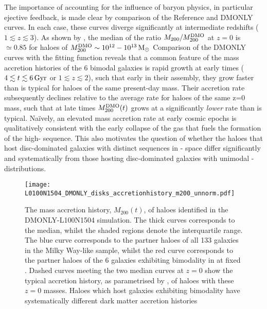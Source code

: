 The importance of accounting for the influence of baryon physics, in particular ejective feedback, is made clear by comparison of the Reference and DMONLY curves. In each case, these curves diverge significantly at intermediate redshifts ($1 \lesssim z \lesssim 3$). As shown by \citet[][their Fig. 1]{2015MNRAS.453L..58S}, the median of the ratio $M_{200}/M_{200}^{\rm DMO}$ at $z=0$ is $\simeq 0.85$ for haloes of $M_{200}^{\rm DMO} \sim 10^{12}-10^{13}\,{\rm M}_\odot$  Comparison of the DMONLY curves with the \citet{2015MNRAS.450.1514C} fitting function reveals that a common feature of the mass accretion histories of the 6 bimodal galaxies is rapid growth at early times ($4 \lesssim t \lesssim 6\,{\rm Gyr}$ or $1 \lesssim z \lesssim 2$), such that early in their assembly, they grow faster than is typical for haloes of the same present-day mass. Their accretion rate subsequently declines relative to the average rate for haloes of the same z=0 mass, such that at late times $M_{200}^{\rm DMO}(t)$ grows at a significantly \textit{lower} rate than is typical. Na\"ively, an elevated mass accretion rate at early cosmic epochs is qualitatively consistent with the early collapse of the gas that fuels the formation of the high-\afe{} sequence. This also motivates the question of whether the haloes that host disc-dominated galaxies with distinct sequences in \afe{}-\feh{} space differ significantly and systematically from those hosting disc-dominated galaxies with unimodal \afe{}-\feh{} distributions. 

\begin{figure}
\texttt{[image: L0100N1504\_DMONLY\_disks\_accretionhistory\_m200\_unnorm.pdf]}
\caption[Mass accretion history of \afe{}-bimodal haloes in the DMONLY-L100N1504 simulation, compared to the accretion history of haloes hosting galaxies at the same stellar mass which do not show the same bimodality]{\label{fig:comp_uni_bi_acc_hist} The mass accretion history, $M_{200}(t)$, of haloes identified in the DMONLY-L100N1504 simulation. The thick curves corresponds to the median, whilst the shaded regions denote the interquartile range. The blue curve corresponds to the partner haloes of all 133 galaxies in the Milky Way-like sample, whilst the red curve corresponds to the partner haloes of the 6 galaxies exhibiting bimodality in \afe{} at fixed \feh{}. Dashed curves meeting the two median curves at $z=0$ show the typical accretion history, as parametrised by \citep{2015MNRAS.450.1514C}, of haloes with these $z=0$ masses. Haloes which host galaxies exhibiting \afe{} bimodality have systematically different dark matter accretion histories}
\end{figure}

